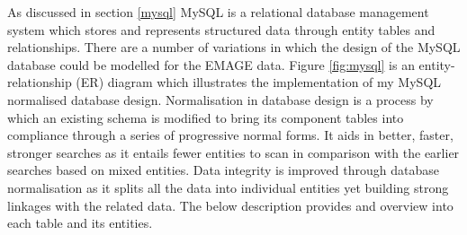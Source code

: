 As discussed in section \ref{mysql} MySQL is a relational database management system which stores and represents structured data through entity tables and relationships. There are a number of variations in which the design of the MySQL database could be modelled for the EMAGE data. Figure \ref{fig:mysql} is an entity-relationship (ER) diagram which illustrates the implementation of my MySQL normalised database design. Normalisation in database design is a process by which an existing schema is modified to bring its component tables into compliance through a series of progressive normal forms. It aids in better, faster, stronger searches as it entails fewer entities to scan in comparison with the earlier searches based on mixed entities. Data integrity is improved through database normalisation as it splits all the data into individual entities yet building strong linkages with the related data. The below description provides and overview into each table and its entities.

